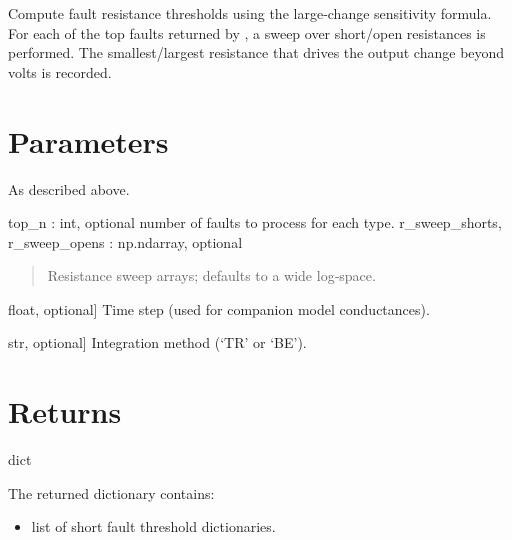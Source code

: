 \documentclass[letterpaper,10pt,english]{sphinxmanual}
\begin{document}
\begin{fulllineitems}

\pysigstartsignatures
\pysigline
{}
\pysigline
{}
\pysigline
{}
\pysigstopsignatures
\sphinxAtStartPar
Compute fault resistance thresholds using the large‑change sensitivity
formula.  For each of the top faults returned by
{\hyperref[\detokenize{fault_analysis:perform_global_ranking}]{}}, a sweep over short/open resistances is performed.
The smallest/​largest resistance that drives the output change beyond
 volts is recorded.


\section{Parameters}
\label{\detokenize{fault_analysis:id3}}\begin{description}
\sphinxAtStartPar
As described above.

\end{description}

\sphinxAtStartPar
top\_n : int, optional \textendash{} number of faults to process for each type.
r\_sweep\_shorts, r\_sweep\_opens : np.ndarray, optional
\begin{quote}

\sphinxAtStartPar
Resistance sweep arrays; defaults to a wide log‑space.
\end{quote}
\begin{description}
\sphinxlineitem{dt}{[}float, optional{]}
\sphinxAtStartPar
Time step (used for companion model conductances).

\sphinxlineitem{method}{[}str, optional{]}
\sphinxAtStartPar
Integration method (‘TR’ or ‘BE’).

\end{description}


\section{Returns}
\label{\detokenize{fault_analysis:id4}}
\sphinxAtStartPar
dict

\sphinxAtStartPar
The returned dictionary contains:
\begin{itemize}
\item {} 
\sphinxAtStartPar
{} \textendash{} list of short fault threshold dictionaries.


\end{itemize}
\end{fulllineitems}
\end{document}
